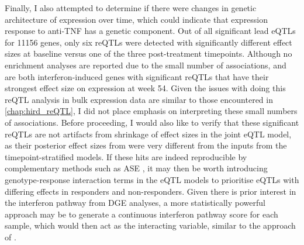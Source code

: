 Finally, I also attempted to determine if there were changes in genetic architecture of expression over time,
which could indicate that expression response to anti-\gls{TNF} has a genetic component.
Out of all significant lead \glspl{eQTL} for 11156 genes, only six \glspl{reQTL} were detected with significantly different effect sizes at baseline versus one of the three post-treatment timepoints.
Although no enrichment analyses are reported due to the small number of associations, 
 and  are both interferon-induced genes with significant \glspl{reQTL} that have their strongest effect size on expression at week 54.
Given the issues with doing this \gls{reQTL} analysis in bulk expression data are similar to those encountered in \autoref{chap:hird_reQTL},
I did not place emphasis on interpreting these small numbers of associations.
Before proceeding, I would also like to verify that these significant \glspl{reQTL} are not artifacts from shrinkage of effect sizes in the joint \gls{eQTL} model,
as their posterior effect sizes from  were very different from the inputs from the timepoint-stratified models.
If these hits are indeed reproducible by complementary methods such as \gls{ASE} \autocite{gutierrez-arcelus2020AllelespecificExpressionChanges},
it may then be worth introducing genotype-response interaction terms in the \gls{eQTL} models
to prioritise \glspl{eQTL} with differing effects in responders and non-responders.
Given there is prior interest in the interferon pathway from \gls{DGE} analyses,
a more statistically powerful approach may be to generate a continuous interferon pathway score for each sample,
which would then act as the interacting variable,
similar to the approach of \textcite{davenport2018DiscoveringVivoCytokineeQTL}.

